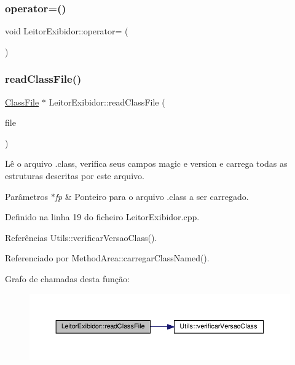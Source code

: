 \subsubsection{\texorpdfstring{operator=()}{operator=()}}
{\footnotesize\ttfamily void Leitor\+Exibidor\+::operator= (\begin{DoxyParamCaption}\item[{\hyperlink{classLeitorExibidor}{Leitor\+Exibidor} const \&}]{ }\end{DoxyParamCaption})\hspace{0.3cm}{\ttfamily [private]}}

\mbox{\label{classLeitorExibidor_af6f4f84cbfaf72e6673e1dc42023b308}} 
\subsubsection{\texorpdfstring{read\+Class\+File()}{readClassFile()}}
{\footnotesize\ttfamily \hyperlink{classClassFile}{Class\+File} $\ast$ Leitor\+Exibidor\+::read\+Class\+File (\begin{DoxyParamCaption}\item[{F\+I\+LE $\ast$}]{file }\end{DoxyParamCaption})}

Lê o arquivo .class, verifica seus campos magic e version e carrega todas as estruturas descritas por este arquivo. 
\begin{DoxyParams}{Parâmetros}
{\em $\ast$fp} & Ponteiro para o arquivo .class a ser carregado. \\
\hline
\end{DoxyParams}


Definido na linha 19 do ficheiro Leitor\+Exibidor.\+cpp.



Referências Utils\+::verificar\+Versao\+Class().



Referenciado por Method\+Area\+::carregar\+Class\+Named().

Grafo de chamadas desta função\+:
\nopagebreak
\begin{figure}[H]
\begin{center}
\leavevmode
\includegraphics[width=350pt]{classLeitorExibidor_af6f4f84cbfaf72e6673e1dc42023b308_cgraph}
\end{center}
\end{figure}
\mbox{\label{classLeitorExibidor_af679ae83326347418cd0d3c90776d7a3}} 
